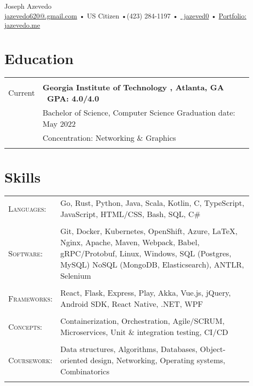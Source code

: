\documentclass[a4paper,11pt]{article}
\newcommand{\lcolwidth}{2.2cm}
\newcommand{\lcolwidthinner}{2.1cm}
\newcommand{\rcolwidth}{16.2cm}
\newenvironment{rsection}[1]
  {
    \section{#1}
    \begin{tabular}{>{\raggedleft\arraybackslash}p{\lcolwidth}|p{\rcolwidth}}
   } {
    \\\multicolumn{2}{c}{} \\[-10pt]
    \end{tabular}
  }
\newcommand{\rheader}[2]{
    \multirow[t]{2}{*}{
        \begin{minipage}[t]{\lcolwidthinner}
            \begin{flushright}
                \textsc{#1}
            \end{flushright}
        \end{minipage}
    } & \textbf{#2}
}
\newcommand{\rline}[1]{\\& #1}
\newcommand{\ritem}[2][ •\hspace{3pt}]{\\[-2pt]& \footnotesize{#1#2}}
\newenvironment{rskills}[1][Skills]
  {
    \section{#1}
    \begin{tabular}{>{\raggedleft\arraybackslash}p{\lcolwidth}p{\rcolwidth}}
    } {
    \end{tabular}
  }
\newcommand{\rskill}[2]{\textsc{#1}:& \small #2 \\ & \\[-14pt]}
\newcommand{\rdot}{\xspace\hspace{0pt}•\hspace{3pt}\xspace}
\begin{document}
\hsize=7.5in \vsize=11in
\hoffset=-0.65in \voffset=-0.5in
\pdfpagewidth=8.5in
\pdfpageheight=11in
\pagestyle{empty}

\newcommand{\at}{@}
\newcommand{\dotgmailcom}{.gmail.com}

\begin{center}
     \Huge       Joseph Azevedo
  \\[2pt] \normalsize \href{mailto:jazevedo620\at\dotgmailcom}{jazevedo620\at\dotgmailcom}
    \rdot US Citizen \rdot (423) 284-1197 \rdot
\href{https://github.com/jazeved0}{\faGithub\ jazeved0} \rdot
    \href{https://jazevedo.me}{Portfolio: jazevedo.me} \\[6pt]
\end{center}
\vspace{11pt}


\begin{rsection}{Education}
  \rheader{Jun 2018 -\\[-1pt] Current}{Georgia Institute of Technology
    {\normalfont, Atlanta, GA \hfill\  GPA: 4.0/4.0\ }}
  \rline{Bachelor of Science, Computer Science \hfill Graduation date: May 2022}
  \vspace{2pt}
  \ritem[]{Concentration: Networking \& Graphics}
\end{rsection}
\vspace{-4pt}


\begin{rskills}
  \rskill{Languages}  {Go, Rust, Python, Java, Scala, Kotlin, C, TypeScript,
                      JavaScript, HTML/CSS, Bash, SQL, C\#}
  \rskill{Software}   {Git, Docker, Kubernetes, OpenShift, Azure, \LaTeX,
                      Nginx, Apache, Maven, Webpack, Babel,
                      gRPC/Protobuf, Linux, Windows, SQL (Postgres, MySQL)
                      NoSQL (MongoDB, Elasticsearch), ANTLR, Selenium}
  \rskill{Frameworks} {React, Flask, Express, Play, Akka, Vue.js, jQuery,
                      Android SDK, React Native, .NET, WPF}
  \rskill{Concepts}   {Containerization, Orchestration, Agile/SCRUM, Microservices,
                      Unit \& integration testing, CI/CD}
  \rskill{Coursework} {Data structures, Algorithms, Databases, Object-oriented design,
                      Networking, Operating systems, Combinatorics}
\end{rskills}
\vspace{7pt}
\end{document}
